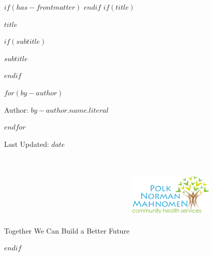 $if(has-frontmatter)$
\frontmatter
$endif$
$if(title)$
\cleardoublepage
\thispagestyle{empty}
{\centering
\vspace*{1cm} %
{\Huge\bfseries $title$ \par}

$if(subtitle)$
\vspace{3ex}
{\Large\bfseries $subtitle$ \par}
$endif$
 
$for(by-author)$
\vspace{3ex} %
{\Large Author: $by-author.name.literal$ \par}
$endfor$
\vspace{3ex} %
{\Large Last Updated: $date$ \par}

\vspace{40ex}
\begin{minipage}{1\textwidth}
  \raggedright
  \hspace{10cm} %
  {\Large Together We Can Build a Better Future \hspace{4cm} \includegraphics[width=4cm, height=4cm]{pages/Attachments/logo_PNM.png}}
\end{minipage}

}
$endif$
